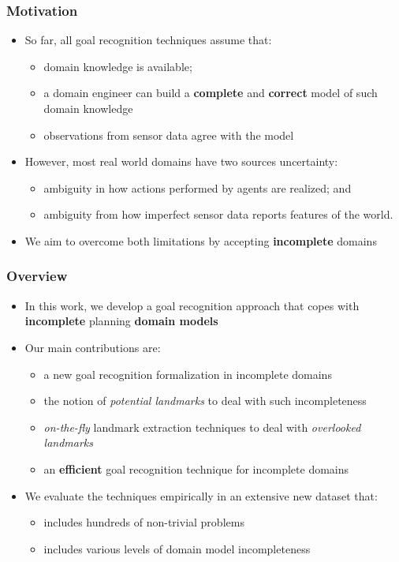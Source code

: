 \documentclass{beamer}
\begin{document}
\begin{frame}[c]\frametitle{Motivation}
	\begin{itemize}
		\item So far, all goal recognition techniques assume that:
		\begin{itemize}
			\item domain knowledge is available;
			\item a domain engineer can build a \textbf{complete} and \textbf{correct} model of such domain knowledge 
			\item observations from sensor data agree with the model
		\end{itemize}
		\item However, most real world domains have two sources uncertainty:
		\begin{itemize}
			\item ambiguity in how actions performed by agents are realized; and
			\item ambiguity from how imperfect sensor data reports features of the world.
		\end{itemize}
		\item We aim to overcome both limitations by accepting \textbf{incomplete} domains
	\end{itemize}
\end{frame}

\begin{frame}[c]\frametitle{Overview}
	\begin{itemize}
		\item In this work, we develop a goal recognition approach that copes with \textbf{incomplete} planning \textbf{domain models}
		\item Our main contributions are:
		\begin{itemize}
			\item a new goal recognition formalization in incomplete domains
			\item the notion of \emph{potential landmarks} to deal with such incompleteness
			\item \emph{on-the-fly} landmark extraction techniques to deal with \emph{overlooked landmarks}
			\item an \textbf{efficient} goal recognition technique for incomplete domains
		\end{itemize}
		\item We evaluate the techniques empirically in an extensive new dataset that:
		\begin{itemize}
			\item includes hundreds of non-trivial problems
			\item includes various levels of domain model incompleteness
		\end{itemize}
	\end{itemize}
\end{frame}
\end{document}
